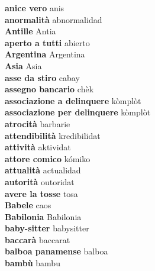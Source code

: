 \textbf{ anice vero  } anis \\
\textbf{ anormalità  } abnormalidad \\
\textbf{ Antille  } Antia \\
\textbf{ aperto a tutti  } abierto \\
\textbf{ Argentina  } Argentina \\
\textbf{ Asia  } Asia \\
\textbf{ asse da stiro  } cabay \\
\textbf{ assegno bancario  } chèk \\
\textbf{ associazione a delinquere  } kòmplòt \\
\textbf{ associazione per delinquere  } kòmplòt \\
\textbf{ atrocità  } barbarie \\
\textbf{ attendibilità  } kredibilidat \\
\textbf{ attività  } aktividat \\
\textbf{ attore comico  } kómiko \\
\textbf{ attualità  } actualidad \\
\textbf{ autorità  } outoridat \\
\textbf{ avere la tosse  } tosa \\
\textbf{ Babele  } caos \\
\textbf{ Babilonia  } Babilonia \\
\textbf{ baby-sitter  } babysitter \\
\textbf{ baccarà  } baccarat \\
\textbf{ balboa panamense  } balboa \\
\textbf{ bambù  } bambu \\
